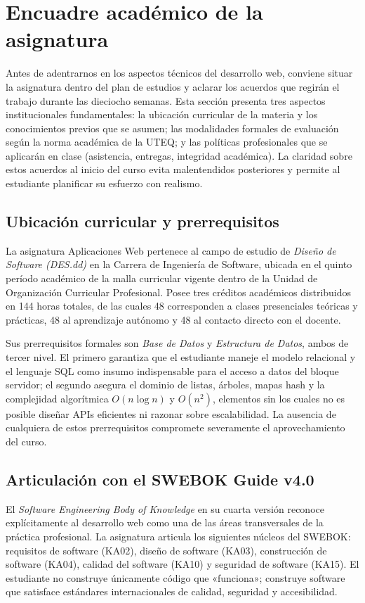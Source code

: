 \documentclass[11pt,a4paper,openany]{book}
\begin{document}
\section{Encuadre académico de la asignatura}

Antes de adentrarnos en los aspectos técnicos del desarrollo web,
conviene situar la asignatura dentro del plan de estudios y aclarar
los acuerdos que regirán el trabajo durante las dieciocho semanas.
Esta sección presenta tres aspectos institucionales fundamentales: la
ubicación curricular de la materia y los conocimientos previos que se
asumen; las modalidades formales de evaluación según la norma
académica de la UTEQ; y las políticas profesionales que se aplicarán
en clase (asistencia, entregas, integridad académica). La claridad
sobre estos acuerdos al inicio del curso evita malentendidos
posteriores y permite al estudiante planificar su esfuerzo con
realismo.

\subsection{Ubicación curricular y prerrequisitos}

La asignatura Aplicaciones Web pertenece al campo de estudio de
\emph{Diseño de Software (DES.dd)} en la Carrera de Ingeniería de
Software, ubicada en el quinto período académico de la malla curricular
vigente dentro de la Unidad de Organización Curricular Profesional.
Posee tres créditos académicos distribuidos en 144 horas totales, de
las cuales 48 corresponden a clases presenciales teóricas y prácticas,
48 al aprendizaje autónomo y 48 al contacto directo con el docente.

Sus prerrequisitos formales son \emph{Base de Datos} y \emph{Estructura
de Datos}, ambos de tercer nivel. El primero garantiza que el
estudiante maneje el modelo relacional y el lenguaje SQL como insumo
indispensable para el acceso a datos del bloque servidor; el segundo
asegura el dominio de listas, árboles, mapas hash y la complejidad
algorítmica $O(n\log n)$ y $O(n^2)$, elementos sin los cuales no es
posible diseñar APIs eficientes ni razonar sobre escalabilidad. La
ausencia de cualquiera de estos prerrequisitos compromete severamente
el aprovechamiento del curso.

\subsection{Articulación con el SWEBOK Guide v4.0}

El \emph{Software Engineering Body of Knowledge} en su cuarta versión
\cite{washizaki2024swebok} reconoce explícitamente al desarrollo web
como una de las áreas transversales de la práctica profesional. La
asignatura articula los siguientes núcleos del SWEBOK: requisitos de
software (KA02), diseño de software (KA03), construcción de software
(KA04), calidad del software (KA10) y seguridad de software (KA15). El
estudiante no construye únicamente código que «funciona»; construye
software que satisface estándares internacionales de calidad,
seguridad y accesibilidad.
\end{document}
